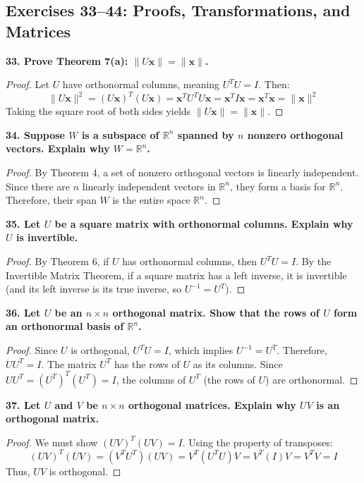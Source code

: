 \documentclass[11pt, letterpaper]{article}
\theoremstyle{definition}
\theoremstyle{remark}
\newcommand{\R}{\mathbb{R}}
\begin{document}
\subsection{Exercises 33--44: Proofs, Transformations, and Matrices}

\textbf{33. Prove Theorem 7(a): $\|U\mathbf{x}\| = \|\mathbf{x}\|$.}
\begin{proof}
    Let $U$ have orthonormal columns, meaning $U^T U = I$. Then:
    \[ \|U\mathbf{x}\|^2 = (U\mathbf{x})^T (U\mathbf{x}) = \mathbf{x}^T U^T U \mathbf{x} = \mathbf{x}^T I \mathbf{x} = \mathbf{x}^T \mathbf{x} = \|\mathbf{x}\|^2 \]
    Taking the square root of both sides yields $\|U\mathbf{x}\| = \|\mathbf{x}\|$.
\end{proof}

\textbf{34. Suppose $W$ is a subspace of $\R^n$ spanned by $n$ nonzero orthogonal vectors. Explain why $W = \R^n$.}
\begin{proof}
    By Theorem 4, a set of nonzero orthogonal vectors is linearly independent. Since there are $n$ linearly independent vectors in $\R^n$, they form a basis for $\R^n$. Therefore, their span $W$ is the entire space $\R^n$.
\end{proof}

\textbf{35. Let $U$ be a square matrix with orthonormal columns. Explain why $U$ is invertible.}
\begin{proof}
    By Theorem 6, if $U$ has orthonormal columns, then $U^T U = I$. By the Invertible Matrix Theorem, if a square matrix has a left inverse, it is invertible (and its left inverse is its true inverse, so $U^{-1} = U^T$).
\end{proof}

\textbf{36. Let $U$ be an $n \times n$ orthogonal matrix. Show that the rows of $U$ form an orthonormal basis of $\R^n$.}
\begin{proof}
    Since $U$ is orthogonal, $U^T U = I$, which implies $U^{-1} = U^T$. Therefore, $U U^T = I$. The matrix $U^T$ has the rows of $U$ as its columns. Since $U U^T = (U^T)^T (U^T) = I$, the columns of $U^T$ (the rows of $U$) are orthonormal.
\end{proof}

\textbf{37. Let $U$ and $V$ be $n \times n$ orthogonal matrices. Explain why $UV$ is an orthogonal matrix.}
\begin{proof}
    We must show $(UV)^T (UV) = I$. Using the property of transposes:
    \[ (UV)^T (UV) = (V^T U^T) (UV) = V^T (U^T U) V = V^T (I) V = V^T V = I \]
    Thus, $UV$ is orthogonal.
\end{proof}
\end{document}
